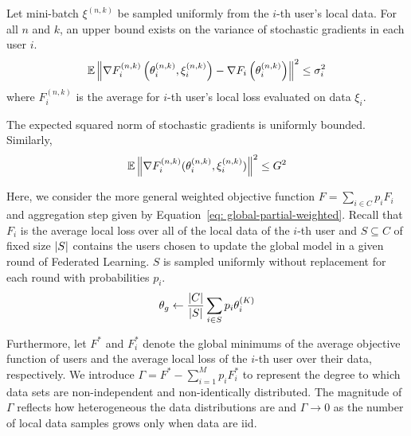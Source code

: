 \begin{assumption}
\label{ass: grad-var}
    Let mini-batch $\xi^{(n, k)}$ be sampled uniformly from the $i$-th user's local data. For all $n$ and $k$, an upper bound exists on the variance of stochastic gradients in each user $i$. 
    \begin{align*}
        \mathbb{E} \left\lVert\nabla F_i^{(n, k)} \left( \theta_i^{(n, k)}, \xi_i^{(n, k)} \right) - \nabla F_i \left( \theta_i^{(n, k)} \right)\right\rVert^2 \leq \sigma_i^2
    \end{align*}
    where $F_i^{(n, k)}$ is the average for $i$-th user's local loss evaluated on data $\xi_i$.
\end{assumption}

\begin{assumption}
\label{ass: grad-norm}
    The expected squared norm of stochastic gradients is uniformly bounded. Similarly, 
    \begin{align*}
        \mathbb{E} \left\lVert\nabla F_i^{(n, k)} ( \theta_i^{(n, k)}, \xi_i^{(n, k)} )\right\rVert^2 \leq G^2
    \end{align*}
\end{assumption}

Here, we consider the more general weighted objective function $F = \sum_{i \in C} p_i F_i$ and aggregation step given by Equation~\ref{eq: global-partial-weighted}.
Recall that $F_i$ is the average local loss over all of the local data of the $i$-th user and $S \subseteq C$ of fixed size $\left\lvert S\right\rvert$ contains the users chosen to update the global model in a given round of Federated Learning. 
$S$ is sampled uniformly without replacement for each round with probabilities $p_i$.
\begin{align}
    \theta_g \leftarrow \dfrac{\left\lvert C\right\rvert}{\left\lvert S\right\rvert} \sum_{i \in S} p_i \theta_i^{(K)}  \label{eq: global-partial-weighted}
\end{align}

Furthermore, let $F^*$ and $F_i^*$ denote the global minimums of the average objective function of users and the average local loss of the $i$-th user over their data, respectively.
We introduce $\Gamma = F^* - \sum_{i = 1}^M p_i F_i^*$ to represent the degree to which data sets are non-independent and non-identically distributed.
The magnitude of $\Gamma$ reflects how heterogeneous the data distributions are and $\Gamma \rightarrow 0$ as the number of local data samples grows only when data are iid.

